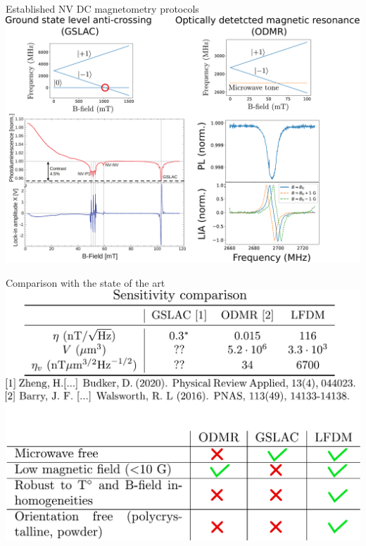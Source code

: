 \documentclass{beamer}
\begin{document}
\begin{frame}{Established NV DC magnetometry protocols}
\centering
\includegraphics[width=\textwidth,height=0.9\textheight,keepaspectratio]{Slide_GSLAC_ODMR}
\end{frame}

\begin{frame}{Comparison with the state of the art}
\centering
\includegraphics[width=\textwidth,height=0.9\textheight,keepaspectratio]{Slide_comparison_litterature}
\end{frame}
\end{document}

